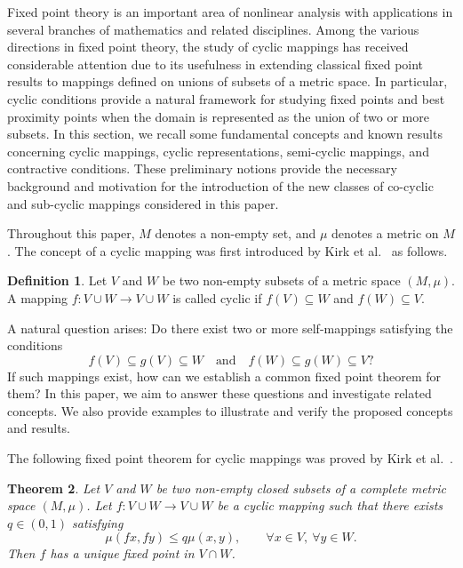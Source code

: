 \documentclass[11pt,a4paper,margin=1in]{amsart}
\theoremstyle{plain}
\newtheorem{theorem}{Theorem}[section]
\theoremstyle{definition}
\newtheorem{definition}[theorem]{Definition}
\theoremstyle{remark}
\begin{document}
Fixed point theory is an important area of nonlinear analysis with
applications in several branches of mathematics and related disciplines.
Among the various directions in fixed point theory, the study of cyclic
mappings has received considerable attention due to its usefulness in
extending classical fixed point results to mappings defined on unions of
subsets of a metric space. In particular, cyclic conditions provide a
natural framework for studying fixed points and best proximity points when
the domain is represented as the union of two or more subsets. In this
section, we recall some fundamental concepts and known results concerning
cyclic mappings, cyclic representations, semi-cyclic mappings, and
contractive conditions. These preliminary notions provide the necessary
background and motivation for the introduction of the new classes of
co-cyclic and sub-cyclic mappings considered in this paper.

Throughout this paper, $M$ denotes a non-empty set, and $\mu$ denotes a
metric on $M$. The concept of a cyclic mapping was first introduced by
Kirk et al.~\cite{W.12} as follows.

\begin{definition}\label{def:cyclic-mapping}
Let $V$ and $W$ be two non-empty subsets of a metric space $(M,\mu)$. 
A mapping $f: V\cup W \to V\cup W$ is called cyclic if $f(V)\subseteq W$ and $f(W)\subseteq V$. 
\end{definition}

A natural question arises: Do there exist two or more self-mappings satisfying the conditions
\[
f(V)\subseteq g(V)\subseteq W
\quad\text{and}\quad
f(W)\subseteq g(W)\subseteq V?
\]
If such mappings exist, how can we establish a common fixed point theorem for them? 
In this paper, we aim to answer these questions and investigate related concepts. 
We also provide examples to illustrate and verify the proposed concepts and results.

The following fixed point theorem for cyclic mappings was proved by Kirk et al.~\cite{W.12}.

\begin{theorem}\label{thm:kirk-cyclic}
Let $V$ and $W$ be two non-empty closed subsets of a complete metric space
$(M,\mu)$. Let $f:V\cup W\to V\cup W$ be a cyclic mapping such that there
exists $q\in(0,1)$ satisfying
\[
\mu(fx,fy)\leq q\mu(x,y),
\qquad \forall x\in V,\ \forall y\in W.
\]
Then $f$ has a unique fixed point in $V\cap W$.
\end{theorem}
\end{document}
